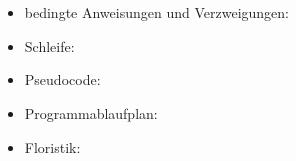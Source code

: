 {{\section*{\BrochureWebsitesAndKeywords}
{\raggedright
\begin{itemize}
  \item bedingte Anweisungen und Verzweigungen: \href{https://de.wikipedia.org/wiki/Bedingte_Anweisung_und_Verzweigung}{}
  \item Schleife: \href{https://de.wikipedia.org/wiki/Schleife_(Programmierung)}{}
  \item Pseudocode: \href{https://de.wikipedia.org/wiki/Pseudocode}{}
  \item Programmablaufplan: \href{https://de.wikipedia.org/wiki/Programmablaufplan}{}
  \item Floristik: \href{https://de.wikipedia.org/wiki/Floristik_(Handwerk)}{}
\end{itemize}


}

}{}

\def\AuthorWeigendM{} %
\def\AuthorMaoY{} %
\def\AuthorKoleszarV{} %
\def\AuthorDatzkoThutS{} %
\def\AuthorPluharZ{} %

\newpage}{}
